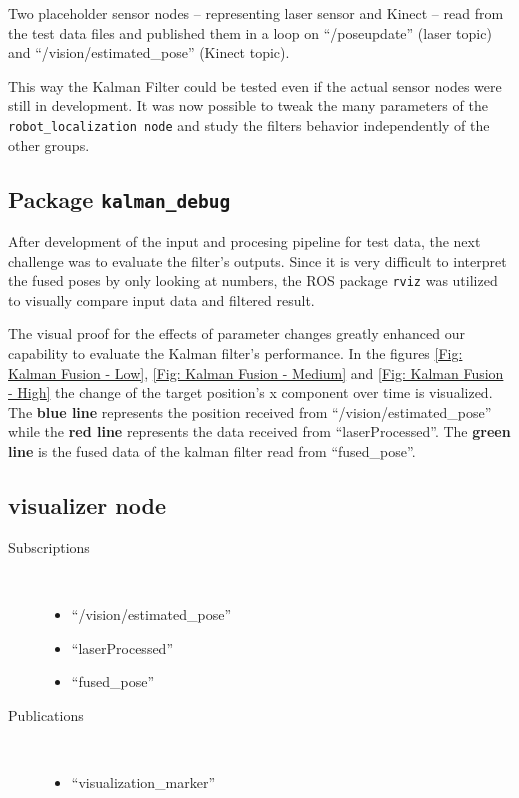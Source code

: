 Two placeholder sensor nodes -- representing laser sensor and Kinect -- read from the test data files and published them in a loop on ``/poseupdate'' (laser topic) and ``/vision/estimated\_pose'' (Kinect topic).

This way the Kalman Filter could be tested even if the actual sensor nodes were still in development. It was now possible to tweak the many parameters of the \texttt{robot\_localization node} and study the filters behavior independently of the other groups.

\subsection{Package \texttt{kalman\_debug}}
After development of the input and procesing pipeline for test data, the next challenge was to evaluate the filter's outputs. Since it is very difficult to interpret the fused poses by only looking at numbers, the ROS package \texttt{rviz} was utilized to visually compare input data and filtered result.

The visual proof for the effects of parameter changes greatly enhanced our capability to evaluate the Kalman filter's performance. In the figures \ref{Fig: Kalman Fusion - Low}, \ref{Fig: Kalman Fusion - Medium} and \ref{Fig: Kalman Fusion - High} the change of the target position's x component over time is visualized. The \textbf{blue line} represents the position received from ``/vision/estimated\_pose'' while the \textbf{red line} represents the data received from ``laserProcessed''. The \textbf{green line} is the fused data of the kalman filter read from ``fused\_pose''.

\subsection{visualizer node}
\begin{description}
\item[Subscriptions]\
	\begin{itemize}
	\item ``/vision/estimated\_pose'' 
	\item ``laserProcessed''
	\item ``fused\_pose''
	\end{itemize}
	
\item[Publications]\
	\begin{itemize}
	\item ``visualization\_marker''
	\end{itemize}
\end{description}

